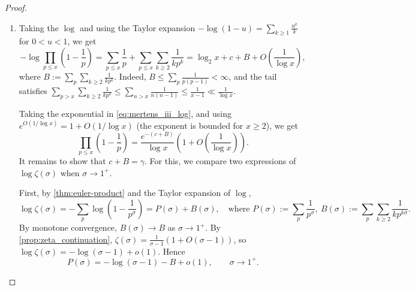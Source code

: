 \begin{proof}
\begin{enumerate}[label={\upshape\roman*)}]
\begin{equation*}
        \end{equation*}
        Taking $c = 1 - \log_2 2 + \int_2^\infty\frac{R(t)}{t\log^2t}\,dt$, we obtain
        \begin{equation*}
            \sum_{p \le x}\frac{1}{p} = \log_2 x  + c + O \left(\frac{1}{\log x}\right).
        \end{equation*}
        \item Taking the $\log$ and using the Taylor expansion $-\log(1-u) = \sum_{k\ge1}\frac{u^k}{k}$ for $0<u<1$, we get
            \begin{equation}\label{eq:mertens_iii_log}
                -\log \prod_{p \le x}\left(1- \frac{1}{p}\right) = \sum_{p\le x}\frac1p + \sum_{p\le x}\sum_{k\ge2}\frac{1}{kp^k} = \log_2 x + c + B + O\left(\frac{1}{\log x}\right),
            \end{equation}
            where $B := \sum_p\sum_{k\ge2}\frac{1}{kp^k}$. Indeed, $B\le\sum_p\frac{1}{p(p-1)}<\infty$, and the tail satisfies $\sum_{p>x}\sum_{k\ge2}\frac{1}{kp^k}\le\sum_{n>x}\frac{1}{n(n-1)}\le\frac{1}{x-1}\ll\frac{1}{\log x}$.

            Taking the exponential in \cref{eq:mertens_iii_log}, and using $e^{O(1/\log x)} = 1 + O(1/\log x)$ (the exponent is bounded for $x \ge 2$), we get
            \begin{equation*}
                \prod_{p \le x}\left(1- \frac{1}{p}\right) = \frac{e^{-(c+B)}}{\log x}\left(1+O\left(\frac1{\log x}\right)\right).
            \end{equation*}
            It remains to show that $c + B = \gamma$. For this, we compare two expressions of $\log\zeta(\sigma)$ when $\sigma\to1^+$.

            First, by \cref{thm:euler-product} and the Taylor expansion of $\log$,
            \begin{equation*}
                \log\zeta(\sigma) = -\sum_p\log\left(1-\frac{1}{p^\sigma}\right) = P(\sigma) + B(\sigma),\quad\text{where } P(\sigma) := \sum_p\frac1{p^\sigma},\ B(\sigma) := \sum_p\sum_{k\ge2}\frac{1}{kp^{k\sigma}}.
            \end{equation*}
            By monotone convergence, $B(\sigma)\to B$ as $\sigma\to1^+$. By \cref{prop:zeta_continuation}, $\zeta(\sigma) = \frac{1}{\sigma-1}\left(1+O(\sigma-1)\right)$, so $\log\zeta(\sigma) = -\log(\sigma-1) + o(1)$. Hence
            \begin{equation}\label{eq:mertens_iii_P_first}
                P(\sigma) = -\log(\sigma-1) - B + o(1), \qquad \sigma\to1^+.
            \end{equation}


\end{enumerate}
\end{proof}
